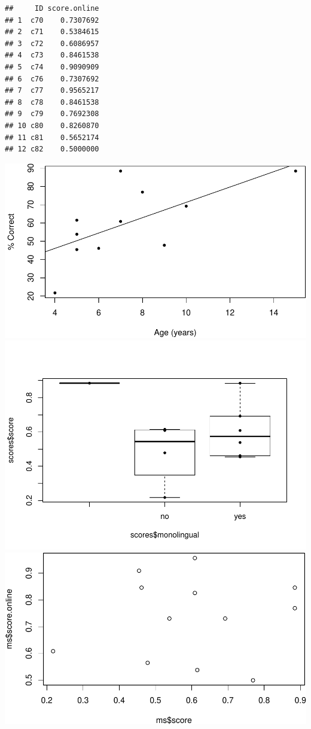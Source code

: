 \documentclass[english,,man,floatsintext]{apa6}
\begin{document}
\begin{verbatim}
##     ID score.online
## 1  c70    0.7307692
## 2  c71    0.5384615
## 3  c72    0.6086957
## 4  c73    0.8461538
## 5  c74    0.9090909
## 6  c76    0.7307692
## 7  c77    0.9565217
## 8  c78    0.8461538
## 9  c79    0.7692308
## 10 c80    0.8260870
## 11 c81    0.5652174
## 12 c82    0.5000000
\end{verbatim}

\includegraphics{manuscript_files/figure-latex/cars-1.pdf} \includegraphics{manuscript_files/figure-latex/cars-2.pdf} \includegraphics{manuscript_files/figure-latex/cars-3.pdf}
\end{document}
